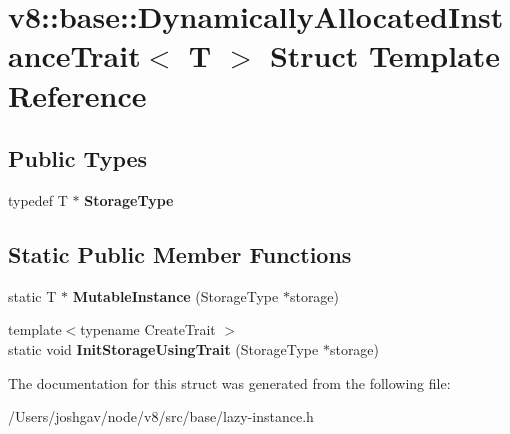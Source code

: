 \hypertarget{structv8_1_1base_1_1_dynamically_allocated_instance_trait}{}\section{v8\+:\+:base\+:\+:Dynamically\+Allocated\+Instance\+Trait$<$ T $>$ Struct Template Reference}
\label{structv8_1_1base_1_1_dynamically_allocated_instance_trait}
\subsection*{Public Types}
\begin{DoxyCompactItemize}
\item 
typedef T $\ast$ {\bfseries Storage\+Type}\hypertarget{structv8_1_1base_1_1_dynamically_allocated_instance_trait_a57084ee367a46e0cd2c94b409ae060f8}{}\label{structv8_1_1base_1_1_dynamically_allocated_instance_trait_a57084ee367a46e0cd2c94b409ae060f8}

\end{DoxyCompactItemize}
\subsection*{Static Public Member Functions}
\begin{DoxyCompactItemize}
\item 
static T $\ast$ {\bfseries Mutable\+Instance} (Storage\+Type $\ast$storage)\hypertarget{structv8_1_1base_1_1_dynamically_allocated_instance_trait_a10b71279ad96ca2d4260c341ba961bde}{}\label{structv8_1_1base_1_1_dynamically_allocated_instance_trait_a10b71279ad96ca2d4260c341ba961bde}

\item 
{\footnotesize template$<$typename Create\+Trait $>$ }\\static void {\bfseries Init\+Storage\+Using\+Trait} (Storage\+Type $\ast$storage)\hypertarget{structv8_1_1base_1_1_dynamically_allocated_instance_trait_a42956a3fa67d94f0e1d4fc8c2a5d7709}{}\label{structv8_1_1base_1_1_dynamically_allocated_instance_trait_a42956a3fa67d94f0e1d4fc8c2a5d7709}

\end{DoxyCompactItemize}


The documentation for this struct was generated from the following file\+:\begin{DoxyCompactItemize}
\item 
/\+Users/joshgav/node/v8/src/base/lazy-\/instance.\+h\end{DoxyCompactItemize}
